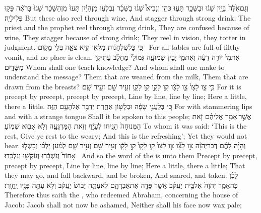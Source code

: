 {וְגַם\maqqaf אֵ֙לֶּה֙ בַּיַּ֣יִן שָׁג֔וּ וּבַשֵּׁכָ֖ר תָּע֑וּ כֹּהֵ֣ן וְנָבִיא֩ שָׁג֨וּ בַשֵּׁכָ֜ר נִבְלְע֣וּ מִן\maqqaf הַיַּ֗יִן תָּעוּ֙ מִן\maqqaf הַשֵּׁכָ֔ר שָׁגוּ֙ בָּרֹאֶ֔ה פָּק֖וּ פְּלִילִיָּֽה׃}
{But these also reel through wine, And stagger through strong drink; The priest and the prophet reel through strong drink, They are confused because of wine, They stagger because of strong drink; They reel in vision, they totter in judgment.}
{כִּ֚י כׇּל\maqqaf שֻׁלְחָנ֔וֹת מָלְא֖וּ קִ֣יא צֹאָ֑ה בְּלִ֖י מָקֽוֹם׃ \petucha }
{For all tables are full of filthy vomit, and no place is clean.}
{אֶת\maqqaf מִי֙ יוֹרֶ֣ה דֵעָ֔ה וְאֶת\maqqaf מִ֖י יָבִ֣ין שְׁמוּעָ֑ה גְּמוּלֵי֙ מֵחָלָ֔ב עַתִּיקֵ֖י מִשָּׁדָֽיִם׃}
{Whom shall one teach knowledge? And whom shall one make to understand the message? Them that are weaned from the milk, Them that are drawn from the breasts?}
{כִּ֣י צַ֤ו לָצָו֙ צַ֣ו לָצָ֔ו קַ֥ו לָקָ֖ו קַ֣ו לָקָ֑ו זְעֵ֥יר שָׁ֖ם זְעֵ֥יר שָֽׁם׃}
{For it is precept by precept, precept by precept, Line by line, line by line; Here a little, there a little.}
{כִּ֚י בְּלַעֲגֵ֣י שָׂפָ֔ה וּבְלָשׁ֖וֹן אַחֶ֑רֶת יְדַבֵּ֖ר אֶל\maqqaf הָעָ֥ם הַזֶּֽה׃}
{For with stammering lips and with a strange tongue Shall it be spoken to this people;}
{אֲשֶׁ֣ר \legarmeh  אָמַ֣ר אֲלֵיהֶ֗ם זֹ֤את הַמְּנוּחָה֙ הָנִ֣יחוּ לֶעָיֵ֔ף וְזֹ֖את הַמַּרְגֵּעָ֑ה וְלֹ֥א אָב֖וּא שְׁמֽוֹעַ׃}
{To whom it was said: ‘This is the rest, Give ye rest to the weary; And this is the refreshing’; Yet they would not hear.}
{וְהָיָ֨ה לָהֶ֜ם דְּבַר\maqqaf יְהֹוָ֗ה צַ֣ו לָצָ֞ו צַ֤ו לָצָו֙ קַ֤ו לָקָו֙ קַ֣ו לָקָ֔ו זְעֵ֥יר שָׁ֖ם זְעֵ֣יר שָׁ֑ם לְמַ֨עַן יֵלְכ֜וּ וְכָשְׁל֤וּ אָחוֹר֙ וְנִשְׁבָּ֔רוּ וְנוֹקְשׁ֖וּ וְנִלְכָּֽדוּ׃ \petucha }
{And so the word of the \lord\space is unto them Precept by precept, precept by precept, Line by line, line by line; Here a little, there a little; That they may go, and fall backward, and be broken, And snared, and taken.}
\newperek
{}
\setcounter{chap}{29}
\setcounter{verse}{22}
{לָכֵ֗ן כֹּֽה\maqqaf אָמַ֤ר יְהֹוָה֙ אֶל\maqqaf בֵּ֣ית יַעֲקֹ֔ב אֲשֶׁ֥ר פָּדָ֖ה אֶת\maqqaf אַבְרָהָ֑ם לֹֽא\maqqaf עַתָּ֤ה יֵבוֹשׁ֙ יַעֲקֹ֔ב וְלֹ֥א עַתָּ֖ה פָּנָ֥יו יֶֽחֱוָֽרוּ׃}
{Therefore thus saith the \lord, who redeemed Abraham, concerning the house of Jacob: Jacob shall not now be ashamed, Neither shall his face now wax pale;}
